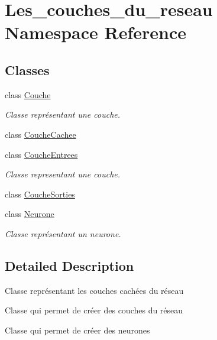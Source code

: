 \hypertarget{namespace_les__couches__du__reseau}{}\section{Les\+\_\+couches\+\_\+du\+\_\+reseau Namespace Reference}
\label{namespace_les__couches__du__reseau}
\subsection*{Classes}
\begin{DoxyCompactItemize}
\item 
class \hyperlink{class_les__couches__du__reseau_1_1_couche}{Couche}
\begin{DoxyCompactList}\small\item\em Classe représentant une couche. \end{DoxyCompactList}\item 
class \hyperlink{class_les__couches__du__reseau_1_1_couche_cachee}{Couche\+Cachee}
\item 
class \hyperlink{class_les__couches__du__reseau_1_1_couche_entrees}{Couche\+Entrees}
\begin{DoxyCompactList}\small\item\em Classe representant une couche. \end{DoxyCompactList}\item 
class \hyperlink{class_les__couches__du__reseau_1_1_couche_sorties}{Couche\+Sorties}
\item 
class \hyperlink{class_les__couches__du__reseau_1_1_neurone}{Neurone}
\begin{DoxyCompactList}\small\item\em Classe représentant un neurone. \end{DoxyCompactList}\end{DoxyCompactItemize}


\subsection{Detailed Description}
Classe représentant les couches cachées du réseau

Classe qui permet de créer des couches du réseau

Classe qui permet de créer des neurones 